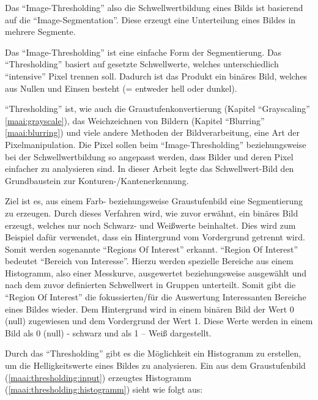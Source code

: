 Das ``Image-Thresholding'' also die Schwellwertbildung eines Bilds ist basierend auf die ``Image-Segmentation''. Diese erzeugt eine Unterteilung eines Bildes in mehrere Segmente.

Das ``Image-Thresholding'' ist eine einfache Form der Segmentierung. Das ``Thresholding'' basiert auf gesetzte Schwellwerte, welches unterschiedlich ``intensive'' Pixel trennen soll. Dadurch ist das Produkt ein binäres Bild, welches aus Nullen und Einsen besteht (= entweder hell oder dunkel).

``Thresholding'' ist, wie auch die Graustufenkonvertierung (Kapitel ``Grayscaling'' \ref{maai:grayscale}), das Weichzeichnen von Bildern (Kapitel ``Blurring'' \ref{maai:blurring}) und viele andere Methoden der Bildverarbeitung, eine Art der Pixelmanipulation. Die Pixel sollen beim ``Image-Thresholding'' beziehungsweise bei der Schwellwertbildung so angepasst werden, dass Bilder und deren Pixel einfacher zu analysieren sind. In dieser Arbeit legte das Schwellwert-Bild den Grundbaustein zur Konturen-/Kantenerkennung.

Ziel ist es, aus einem Farb- beziehungsweise Graustufenbild eine Segmentierung zu erzeugen. Durch dieses Verfahren wird, wie zuvor erwähnt, ein binäres Bild erzeugt, welches nur noch Schwarz- und Weißwerte beinhaltet. Dies wird zum Beispiel dafür verwendet, dass ein Hintergrund vom Vordergrund getrennt wird. Somit werden sogenannte ``Regions Of Interest'' erkannt. ``Region Of Interest'' bedeutet ``Bereich von Interesse''. Hierzu werden spezielle Bereiche aus einem Histogramm, also einer Messkurve, ausgewertet beziehungsweise ausgewählt und nach dem zuvor definierten Schwellwert in Gruppen unterteilt. Somit gibt die ``Region Of Interest'' die fokussierten/für die Auswertung Interessanten Bereiche eines Bildes wieder. Dem Hintergrund wird in einem binären Bild der Wert 0 (null) zugewiesen und dem Vordergrund der Wert 1. Diese Werte werden in einem Bild als 0 (null) - schwarz und als 1 – Weiß dargestellt.

Durch das ``Thresholding'' gibt es die Möglichkeit ein Histogramm zu erstellen, um die Helligkeitswerte eines Bildes zu analysieren. Ein aus dem Graustufenbild (\ref{maai:thresholding:input}) erzeugtes Histogramm (\ref{maai:thresholding:histogramm}) sieht wie folgt aus:

